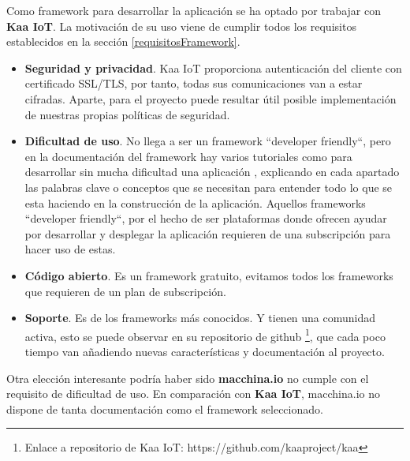 {Como framework para desarrollar la aplicación se ha optado por trabajar con \textbf{Kaa IoT}. La motivación de su uso viene de cumplir todos los requisitos establecidos en la sección \ref{requisitosFramework}.

\begin{itemize}
    \item \textbf{Seguridad y privacidad}. Kaa IoT proporciona autenticación del cliente con certificado SSL/TLS, por tanto, todas sus comunicaciones van a estar cifradas. Aparte, para el proyecto puede resultar útil posible implementación de nuestras propias políticas de seguridad.
    \item \textbf{Dificultad de uso}. No llega a ser un framework ``developer friendly``, pero en la documentación del framework \cite{kaaiot} hay varios tutoriales como para desarrollar sin mucha dificultad una aplicación , explicando en cada apartado las palabras clave o conceptos que se necesitan para entender todo lo que se esta haciendo en la construcción de la aplicación. Aquellos frameworks ``developer friendly``, por el hecho de ser plataformas donde ofrecen ayudar por desarrollar y desplegar la aplicación requieren de una subscripción para hacer uso de estas.
    \item \textbf{Código abierto}. Es un framework gratuito, evitamos todos los frameworks que requieren de un plan de subscripción.
    \item \textbf{Soporte}. Es de los frameworks más conocidos. Y tienen una comunidad activa, esto se puede observar en su repositorio de github \footnote{Enlace a repositorio de Kaa IoT: https://github.com/kaaproject/kaa}, que cada poco tiempo van añadiendo nuevas características y documentación al proyecto.
\end{itemize}


Otra elección interesante podría haber sido \textbf{macchina.io} no cumple con el requisito de dificultad de uso. En comparación con \textbf{Kaa IoT}, macchina.io no dispone de tanta documentación como el framework seleccionado.

}